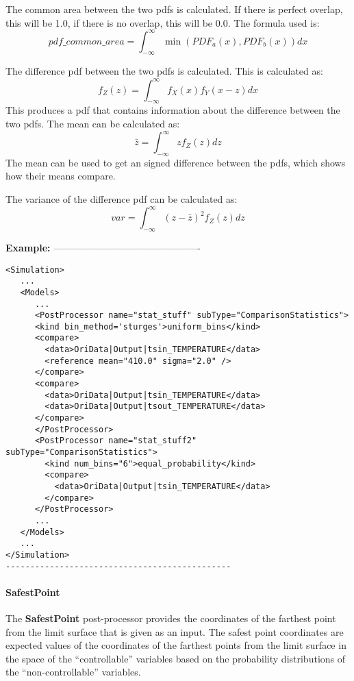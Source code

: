 The common area between the two pdfs is calculated.  If there is
perfect overlap, this will be 1.0, if there is no overlap, this will
be 0.0.  The formula used is:
\begin{equation}
  pdf\_common\_area = \int_{-\infty}^{\infty}{\min(PDF_a(x),PDF_b(x))}dx
\end{equation}

The difference pdf between the two pdfs is calculated.  This is calculated as:
\begin{equation}
  f_Z(z) = \int_{-\infty}^{\infty}f_X(x)f_Y(x-z)dx
\end{equation}
This produces a pdf that contains information about the difference
between the two pdfs.  The mean can be calculated as:
\begin{equation}
  \bar{z} = \int_{-\infty}^{\infty}{z f_Z(z)dz}
\end{equation}
The mean can be used to get an signed difference between the pdfs,
which shows how their means compare.

The variance of the difference pdf can be calculated as:
\begin{equation}
  var = \int_{-\infty}^{\infty}{(z-\bar{z})^2 f_Z(z)dz}
\end{equation}


\textbf{Example:}
----------------------------------------------
\begin{lstlisting}[style=XML]
<Simulation>
   ...
   <Models>
      ...
      <PostProcessor name="stat_stuff" subType="ComparisonStatistics">
      <kind bin_method='sturges'>uniform_bins</kind>
      <compare>
        <data>OriData|Output|tsin_TEMPERATURE</data>
        <reference mean="410.0" sigma="2.0" />
      </compare>
      <compare>
        <data>OriData|Output|tsin_TEMPERATURE</data>
        <data>OriData|Output|tsout_TEMPERATURE</data>
      </compare>
      </PostProcessor>
      <PostProcessor name="stat_stuff2" subType="ComparisonStatistics">
        <kind num_bins="6">equal_probability</kind>
        <compare>
          <data>OriData|Output|tsin_TEMPERATURE</data>
        </compare>
      </PostProcessor>
      ...
   </Models>
   ...
</Simulation>
----------------------------------------------
\end{lstlisting}

\paragraph{SafestPoint}
\label{SafestPoint}
The \textbf{SafestPoint} post-processor provides the coordinates of the farthest
point from the limit surface that is given as an input.
%
The safest point coordinates are expected values of the coordinates of the
farthest points from the limit surface in the space of the ``controllable''
variables based on the probability distributions of the ``non-controllable''
variables.

